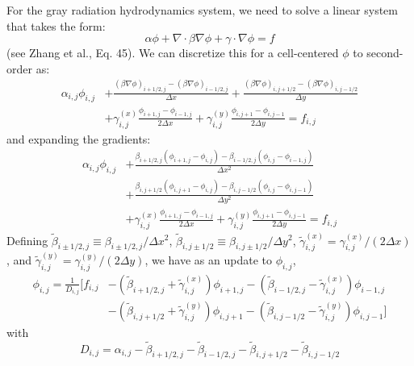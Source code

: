 For the gray radiation hydrodynamics system, we need to solve a
linear system that takes the form:
\begin{equation}
  \alpha \phi + \nabla \cdot \beta \nabla \phi + \gamma \cdot \nabla \phi = f
\end{equation}
(see Zhang et al., Eq. 45). 
We can discretize this for a cell-centered $\phi$ to second-order as:
\begin{align}
  \alpha_{i,j} \phi_{i,j} &+
  \frac{(\beta \nabla \phi)_{i+1/2,j} -
        (\beta \nabla \phi)_{i-1/2,j}}{\Delta x} +
  \frac{(\beta \nabla \phi)_{i,j+1/2} -
        (\beta \nabla \phi)_{i,j-1/2}}{\Delta y} \nonumber \\
  &+
  \gamma^{(x)}_{i,j} \frac{\phi_{i+1,j} - \phi_{i-1,j}}{2\Delta x} +
  \gamma^{(y)}_{i,j} \frac{\phi_{i,j+1} - \phi_{i,j-1}}{2\Delta y} = f_{i,j}
\end{align}
and expanding the gradients:
\begin{align}
  \alpha_{i,j} \phi_{i,j} &+
  \frac{\beta_{i+1/2,j} (\phi_{i+1,j} - \phi_{i,j}) -
        \beta_{i-1/2,j} (\phi_{i,j} - \phi_{i-1,j})}{\Delta x^2} \nonumber \\
 &+
  \frac{\beta_{i,j+1/2} (\phi_{i,j+1} - \phi_{i,j}) -
        \beta_{i,j-1/2} (\phi_{i,j} - \phi_{i,j-1})}{\Delta y^2} \nonumber \\
  &+
  \gamma^{(x)}_{i,j} \frac{\phi_{i+1,j} - \phi_{i-1,j}}{2\Delta x} +
  \gamma^{(y)}_{i,j} \frac{\phi_{i,j+1} - \phi_{i,j-1}}{2\Delta y} = f_{i,j}
\end{align}
Defining $\tilde{\beta}_{i\pm1/2,j} \equiv \beta_{i\pm1/2,j}/\Delta x^2$,
$\tilde{\beta}_{i,j\pm1/2} \equiv \beta_{i,j\pm1/2}/\Delta y^2$,
$\tilde{\gamma}^{(x)}_{i,j} = \gamma^{(x)}_{i,j}/(2\Delta x)$,
and $\tilde{\gamma}^{(y)}_{i,j} = \gamma^{(y)}_{i,j}/(2\Delta y)$, we have
as an update to $\phi_{i,j}$,
\begin{align}
\phi_{i,j} = \frac{1}{D_{i,j}} \bigg [ f_{i,j}
  &-(\tilde{\beta}_{i+1/2,j} + \tilde{\gamma}^{(x)}_{i,j}) \phi_{i+1,j}
   -(\tilde{\beta}_{i-1/2,j} - \tilde{\gamma}^{(x)}_{i,j}) \phi_{i-1,j}
  \nonumber \\
  &-(\tilde{\beta}_{i,j+1/2} + \tilde{\gamma}^{(y)}_{i,j}) \phi_{i,j+1}
   -(\tilde{\beta}_{i,j-1/2} - \tilde{\gamma}^{(y)}_{i,j}) \phi_{i,j-1}
   \bigg ]
\end{align}
with
\begin{equation}
D_{i,j} = \alpha_{i,j} - \tilde{\beta}_{i+1/2,j} - \tilde{\beta}_{i-1/2,j}
                       - \tilde{\beta}_{i,j+1/2} - \tilde{\beta}_{i,j-1/2}
\end{equation}            

